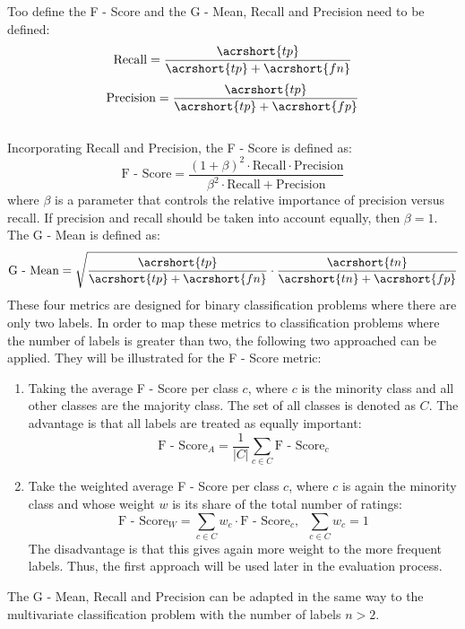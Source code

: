 Too define the F - Score and the G - Mean, Recall and Precision need to be defined:\\
\begin{equation}
    \text{Recall} = \frac{\acrshort{tp}}{\acrshort{tp} + \acrshort{fn}}
\end{equation}
\begin{equation}
    \text{Precision} = \frac{\acrshort{tp}}{\acrshort{tp} + \acrshort{fp}}
\end{equation}\\
Incorporating Recall and Precision, the F - Score is defined as:\\
\begin{equation}
    \text{F - Score} = \frac{(1 + \beta)^{2} \cdot \text{Recall} \cdot \text{Precision}}{\beta^{2} \cdot \text{Recall} + \text{Precision}}
\end{equation}
where $\beta$ is a parameter that controls the relative importance of precision versus recall. If precision and recall should be taken into account equally, then $\beta = 1$.\\
The G - Mean is defined as:\\
\begin{equation}
    \text{G - Mean} = \sqrt{\frac{\acrshort{tp}}{\acrshort{tp} + \acrshort{fn}} \cdot \frac{\acrshort{tn}}{\acrshort{tn} + \acrshort{fp}}}
\end{equation}
These four metrics are designed for binary classification problems where there are only two labels. In order to map these metrics to classification problems where the number of labels is greater than two, the following two approached can be applied. They will be illustrated for the F - Score metric:
\begin{enumerate}
    \item Taking the average F - Score per class $c$, where $c$ is the minority class and all other classes are the majority class. The set of all classes is denoted as $C$. The advantage is that all labels are treated as equally important:
    \begin{equation}
        \text{F - Score}_A = \frac{1}{|C|}\sum_{c \in C} \text{F - Score}_c
    \end{equation}
    \item Take the weighted average F - Score per class $c$, where $c$ is again the minority class and whose weight $w$ is its share of the total number of ratings:
    \begin{equation}
        \text{F - Score}_W = \sum_{c \in C} w_c \cdot \text{F - Score}_c , \;\;\sum_{c \in C} w_c = 1
    \end{equation}
    The disadvantage is that this gives again more weight to the more frequent labels. Thus, the first approach will be used later in the evaluation process.
\end{enumerate}
The G - Mean, Recall and Precision can be adapted in the same way to the multivariate classification problem with the number of labels $n > 2$. 

